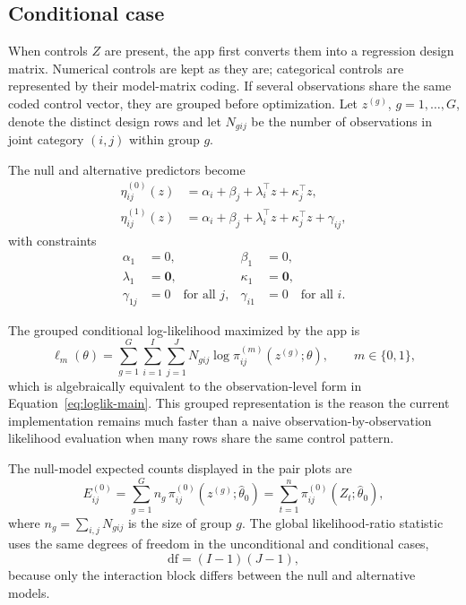 \documentclass[preprint,12pt,a4paper]{elsarticle}
\numberwithin{equation}{section}
\begin{document}
\subsection{Conditional case}

When controls $Z$ are present, the app first converts them into a regression design matrix. Numerical controls are kept as they are; categorical controls are represented by their model-matrix coding. If several observations share the same coded control vector, they are grouped before optimization. Let $z^{(g)}$, $g=1,\dots,G$, denote the distinct design rows and let $N_{gij}$ be the number of observations in joint category $(i,j)$ within group $g$.

The null and alternative predictors become
\begin{align}
\eta^{(0)}_{ij}(z)
&=
\alpha_i+\beta_j+\lambda_i^\top z+\kappa_j^\top z,
\label{eq:app-cond-null}
\\
\eta^{(1)}_{ij}(z)
&=
\alpha_i+\beta_j+\lambda_i^\top z+\kappa_j^\top z+\gamma_{ij},
\label{eq:app-cond-alt}
\end{align}
with constraints
\begin{align}
\alpha_1 &= 0,
&
\beta_1 &= 0,
\label{eq:app-cond-cons-a}
\\
\lambda_1 &= \mathbf{0},
&
\kappa_1 &= \mathbf{0},
\label{eq:app-cond-cons-b}
\\
\gamma_{1j} &= 0 \quad \text{for all } j,
&
\gamma_{i1} &= 0 \quad \text{for all } i.
\label{eq:app-cond-cons-c}
\end{align}

The grouped conditional log-likelihood maximized by the app is
\begin{equation}
\ell_m(\theta)=
\sum_{g=1}^{G}\sum_{i=1}^{I}\sum_{j=1}^{J}
N_{gij}\log \pi^{(m)}_{ij}(z^{(g)};\theta),
\qquad m\in\{0,1\},
\label{eq:app-cond-loglik-grouped}
\end{equation}
which is algebraically equivalent to the observation-level form in Equation~\eqref{eq:loglik-main}. This grouped representation is the reason the current implementation remains much faster than a naive observation-by-observation likelihood evaluation when many rows share the same control pattern.

The null-model expected counts displayed in the pair plots are
\begin{equation}
E^{(0)}_{ij}
=
\sum_{g=1}^{G} n_g\,\pi^{(0)}_{ij}(z^{(g)};\widehat{\theta}_0)
=
\sum_{t=1}^{n}\pi^{(0)}_{ij}(Z_t;\widehat{\theta}_0),
\label{eq:app-cond-expected}
\end{equation}
where $n_g=\sum_{i,j}N_{gij}$ is the size of group $g$. The global likelihood-ratio statistic uses the same degrees of freedom in the unconditional and conditional cases,
\begin{equation}
\mathrm{df}=(I-1)(J-1),
\label{eq:app-df}
\end{equation}
because only the interaction block differs between the null and alternative models.
\end{document}
